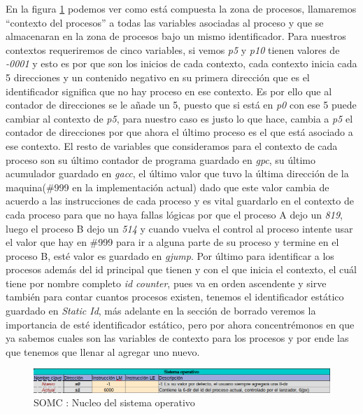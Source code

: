 \documentclass[letterpaper,12pt,oneside]{book}
\begin{document}
			En la figura \ref{fig:somcZonaDeProcesos} podemos ver como está compuesta la zona de procesos, llamaremos ``contexto del procesos'' a todas
			las variables asociadas al proceso y que se almacenaran en la zona de procesos bajo un mismo identificador. Para nuestros contextos
			requeriremos de cinco variables, si vemos \textit{p5} y \textit{p10} tienen valores de \textit{-0001} y esto es por que son los inicios de cada contexto,
			cada contexto inicia cada 5 direcciones y un contenido negativo en su primera dirección que es el identificador significa que no hay proceso en ese
			contexto. Es por ello que al contador de direcciones se le añade un 5, puesto que si está en \textit{p0} con ese 5 puede cambiar al contexto
			de \textit{p5}, para nuestro caso es justo lo que hace, cambia a \textit{p5} el contador de direcciones por que ahora
			el último proceso es el que está asociado a ese contexto. El resto de variables que consideramos para el contexto de cada proceso son su último
			contador de programa guardado en \textit{gpc}, su último acumulador guardado en  \textit{gacc}, el último valor que tuvo la última dirección de
			la maquina(\#999 en la implementación actual) dado que este valor cambia de acuerdo a las instrucciones de cada proceso y es vital guardarlo en
			el contexto de cada proceso para que no haya fallas lógicas por que el proceso A dejo un \textit{819}, luego el proceso B dejo un \textit{514} y
			cuando vuelva el control al proceso intente usar el valor que hay en \#999 para ir a alguna parte de su proceso y termine en el proceso B,
			esté valor es guardado en \textit{gjump}. Por último para identificar a los procesos además del id principal que tienen y con el que
			inicia el contexto, el cuál tiene
			por nombre completo  \textit{id counter}, pues va en orden ascendente y sirve también para contar cuantos procesos existen, tenemos el identificador
			estático guardado en \textit{Static Id}, más adelante en la sección de borrado veremos la importancia de esté identificador
			estático, pero por ahora concentrémonos en que ya sabemos cuales son las variables de contexto para los procesos y por ende
			las que tenemos que llenar al agregar uno nuevo.
			
			

			
		\begin{figure}[h]		
			\centering
			\includegraphics[scale=0.55]{media/CARDIACC/SOMCGeneralNucleo.png}
			\caption{SOMC : Nucleo del sistema operativo}
			\label{fig:somcZonaDeProcesos}
		\end{figure}
\end{document}

